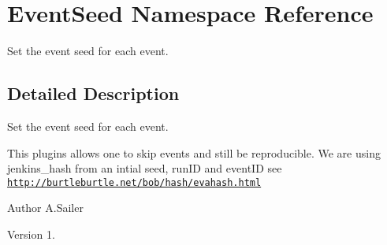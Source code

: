 \hypertarget{namespace_event_seed}{}\section{Event\+Seed Namespace Reference}
\label{namespace_event_seed}


Set the event seed for each event.  




\subsection{Detailed Description}
Set the event seed for each event. 

This plugins allows one to skip events and still be reproducible. We are using jenkins\+\_\+hash from an intial seed, run\+ID and event\+ID see \href{http://burtleburtle.net/bob/hash/evahash.html}{\tt http\+://burtleburtle.\+net/bob/hash/evahash.\+html}

\begin{DoxyAuthor}{Author}
A.\+Sailer 
\end{DoxyAuthor}
\begin{DoxyVersion}{Version}
1. 
\end{DoxyVersion}

